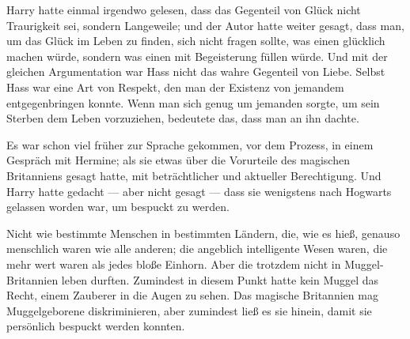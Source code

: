 Harry hatte einmal irgendwo gelesen, dass das Gegenteil von Glück nicht Traurigkeit sei, sondern Langeweile; und der Autor hatte weiter gesagt, dass man, um das Glück im Leben zu finden, sich nicht fragen sollte, was einen glücklich machen würde, sondern was einen mit Begeisterung füllen würde. Und mit der gleichen Argumentation war Hass nicht das wahre Gegenteil von Liebe. Selbst Hass war eine Art von Respekt, den man der Existenz von jemandem entgegenbringen konnte. Wenn man sich genug um jemanden sorgte, um sein Sterben dem Leben vorzuziehen, bedeutete das, dass man an ihn dachte.

Es war schon viel früher zur Sprache gekommen, vor dem Prozess, in einem Gespräch mit Hermine; als sie etwas über die Vorurteile des magischen Britanniens gesagt hatte, mit beträchtlicher und aktueller Berechtigung. Und Harry hatte gedacht — aber nicht gesagt — dass sie wenigstens nach Hogwarts gelassen worden war, um bespuckt zu werden.

Nicht wie bestimmte Menschen in bestimmten Ländern, die, wie es hieß, genauso menschlich waren wie alle anderen; die angeblich intelligente Wesen waren, die mehr wert waren als jedes bloße Einhorn. Aber die trotzdem nicht in Muggel-Britannien leben durften. Zumindest in diesem Punkt hatte kein Muggel das Recht, einem Zauberer in die Augen zu sehen. Das magische Britannien mag Muggelgeborene diskriminieren, aber zumindest ließ es sie hinein, damit sie persönlich bespuckt werden konnten.

